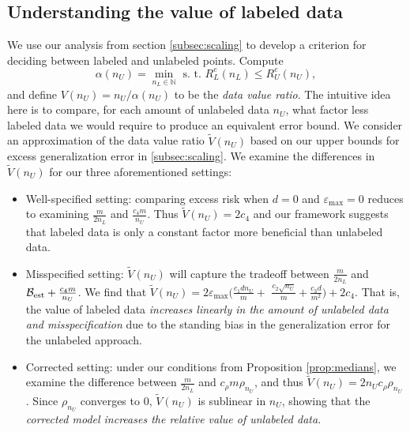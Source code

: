 \subsection{Understanding the value of labeled data}
\vspace{-0.5em}
We use our analysis from section \ref{subsec:scaling} to develop a criterion for deciding between labeled and unlabeled points. Compute
\[\alpha(n_U) = \min_{n_L \in \mathbb{N}} \text{ s. t. } R_L^{e}(n_L) \le R_U^{e}(n_U),\]
and define
$V(n_U) = {n_U}/\alpha(n_U)$
to be the \textit{data value ratio}. The intuitive idea here is to compare, for each amount of unlabeled data $n_U$, what factor less labeled data we would require to produce an equivalent error bound. We consider an approximation of the data value ratio $\widetilde{V}(n_U)$ based on our upper bounds for excess generalization error in \ref{subsec:scaling}. We examine the differences in $\widetilde{V}(n_U)$ for our three aforementioned settings:
\begin{itemize}
    \item Well-specified setting: comparing excess risk when $d = 0$ and $\varepsilon_{\max} = 0$ reduces to examining $\frac{m}{2n_L}$ and $\frac{c_4 m}{n_U}$. Thus $\widetilde{V}(n_U) = 2c_4$ and our framework suggests that labeled data is only a constant factor more beneficial than unlabeled data.
    \item Misspecified setting: $\widetilde{V}(n_U)$ will capture the tradeoff between $\frac{m}{2n_L}$ and $\mathcal{B}_{\mathrm{est}} + \frac{c_4 m }{n_U}$. We find that $\widetilde{V}(n_U) = 2 \varepsilon_{\max} \Big(\frac{c_1 dn_U}{m} +$ $\frac{c_2 \sqrt{n_U}}{m} + \frac{c_3 d}{m^2} \Big) + 2 c_4$. That is, the value of labeled data \textit{increases linearly in the amount of unlabeled data and misspecification} due to the standing bias in the generalization error for the unlabeled approach.  
    \item Corrected setting: under our conditions from Proposition \ref{prop:medians}, we examine the difference between $\frac{m}{2n_L}$ and $ c_\rho m \rho_{n_
    U}$, and thus $\widetilde{V}(n_U) = 2n_U c_{\rho} \rho_{n_U}$. Since $\rho_{n_U}$ converges to $0$, $\widetilde{V}(n_U)$ is sublinear in $n_U$, showing that the \textit{corrected model increases the relative value of unlabeled data.}
\end{itemize}

